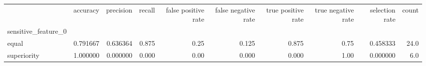 \begin{tabular}{lrrrrrrrrr}
\toprule
{} &  accuracy &  precision &  recall &  false positive rate &  false negative rate &  true positive rate &  true negative rate &  selection rate &  count \\
sensitive\_feature\_0 &           &            &         &                      &                      &                     &                     &                 &        \\
\midrule
equal               &  0.791667 &   0.636364 &   0.875 &                 0.25 &                0.125 &               0.875 &                0.75 &        0.458333 &   24.0 \\
superiority         &  1.000000 &   0.000000 &   0.000 &                 0.00 &                0.000 &               0.000 &                1.00 &        0.000000 &    6.0 \\
\bottomrule
\end{tabular}
